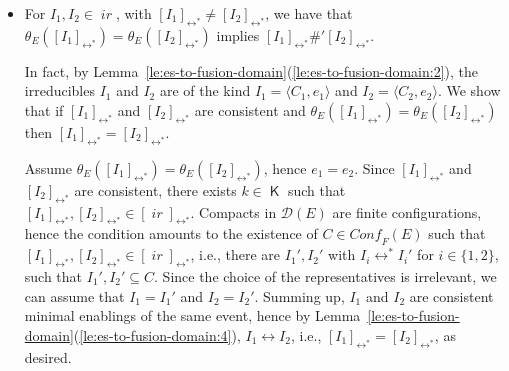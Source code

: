 \documentclass[conference]{IEEEtran}
\renewenvironment{proof}{\begin{IEEEproof}}{\end{IEEEproof}}
\newcommand{\compact}[1]{\ensuremath{\mathop{\mathsf{K}({#1})}}}
\newcommand{\ir}[1]{\ensuremath{\mathop{\mathit{ir}({#1})}}}
\newcommand{\esir}[2]{\ensuremath{\langle{#1}, {#2}\rangle}}
\newcommand{\eqclass}[2][]{\ensuremath{[{#2}]_{\scriptscriptstyle {#1}}}}
\newcommand{\eqclassir}[1]{\ensuremath{\eqclass[\leftrightarrow^*]{#1}}}
\newcommand{\conff}[1]{\ensuremath{\mathit{Conf_F}({#1})}}
\newcommand{\zdom}[0]{\ensuremath{\mathcal{D}}}
\newcommand{\dom}[1]{\ensuremath{\zdom({#1})}}
\begin{document}
\begin{proof}
\begin{itemize}
  \smallskip
  
  \item For  $I_1, I_2 \in \ir{\dom{{E}}}$, with
    $\eqclassir{I_1} \neq \eqclassir{I_2}$, we have that
    $\theta_{{E}}(\eqclassir{I_1}) =
    \theta_{{E}}(\eqclassir{I_2})$
    implies $\eqclassir{I_1} \#' \eqclassir{I_2}$.
    
    In fact, by
    Lemma~\ref{le:es-to-fusion-domain}(\ref{le:es-to-fusion-domain:2}),
    the irreducibles $I_1$ and $I_2$ are of the kind
    $I_1 = \esir{C_1}{e_1}$ and $I_2 = \esir{C_2}{e_2}$. We show that
    if $\eqclassir{I_1}$ and $\eqclassir{I_2}$ are consistent and
    $\theta_{{E}}(\eqclassir{I_1}) = \theta_{{E}}(\eqclassir{I_2})$
    then $\eqclassir{I_1} = \eqclassir{I_2}$.

    Assume
    $\theta_{{E}}(\eqclassir{I_1}) =
    \theta_{{E}}(\eqclassir{I_2})$,
    hence $e_1=e_2$. Since $\eqclassir{I_1}$ and
    $\eqclassir{I_2}$ are consistent, there exists
    $k \in \compact{\dom{{E}}}$ such that
    $\eqclassir{I_1}, \eqclassir{I_2} \in \eqclassir{\ir{k}}$.  
    Compacts in $\dom{{E}}$ are finite configurations, hence the condition
    amounts to the existence of $C \in \conff{{E}}$ such that
    $\eqclassir{I_1}, \eqclassir{I_2} \in \eqclassir{\ir{C}}$, i.e.,
    there  are $I_1', I_2'$ with $I_i \leftrightarrow^* I_i'$ for
    $i \in \{ 1,2\}$, such that $I_1', I_2' \subseteq C$. Since the
    choice of the representatives is irrelevant, we can assume
    that $I_1 = I_1'$ and $I_2 = I_2'$. Summing up, $I_1$ and $I_2$
    are consistent minimal enablings of the same event, hence by
    Lemma~\ref{le:es-to-fusion-domain}(\ref{le:es-to-fusion-domain:4}), $I_1 \leftrightarrow I_2$,
    i.e., $\eqclassir{I_1} = \eqclassir{I_2}$, as desired.

    \smallskip



\end{itemize}
\end{proof}
\end{document}
